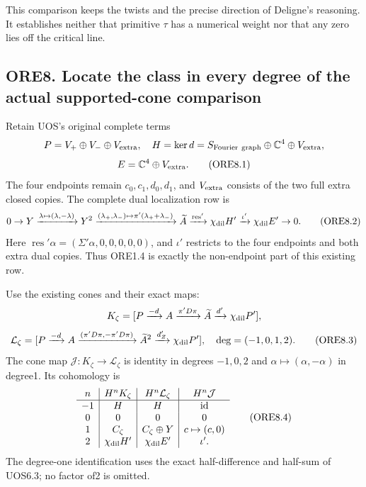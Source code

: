 This comparison keeps the twists and the precise direction of Deligne's
reasoning. It establishes neither that primitive \(\tau\) has a
numerical weight nor that any zero lies off the critical line.

\subsection{ORE8. Locate the class in every degree of the actual
supported-cone
comparison}\label{ore8.-locate-the-class-in-every-degree-of-the-actual-supported-cone-comparison}

Retain UOS's original complete terms \[
P=V_+\oplus V_-\oplus V_{\rm extra},\quad
H=\ker d=S_{\rm Fourier\ graph}\oplus\mathbb C^4\oplus V_{\rm extra},
\] \[
E=\mathbb C^4\oplus V_{\rm extra}.
\tag{ORE8.1}
\] The four endpoints remain \(c_0,c_1,d_0,d_1\), and \(V_{\rm extra}\)
consists of the two full extra closed copies. The complete dual
localization row is \[
0\to Y\xrightarrow{\lambda\mapsto(\lambda,-\lambda)}Y^2
\xrightarrow{(\lambda_+,\lambda_-)\mapsto
\pi'(\lambda_++\lambda_-)}\widetilde A
\xrightarrow{\operatorname{res}'}\chi_{\rm dil}H'
\xrightarrow{\iota'}\chi_{\rm dil}E'\to0.
\tag{ORE8.2}
\] Here \(\operatorname{res}'\alpha=(\Sigma'\alpha,0,0,0,0,0)\), and
\(\iota'\) restricts to the four endpoints and both extra dual copies.
Thus ORE1.4 is exactly the non-endpoint part of this existing row.

Use the existing cones and their exact maps: \[
K_\zeta=[P\xrightarrow{-d}A
\xrightarrow{\pi'D\pi}\widetilde A
\xrightarrow{d'}\chi_{\rm dil}P'],
\] \[
\mathcal L_\zeta=[P\xrightarrow{-d}A
\xrightarrow{(\pi'D\pi,-\pi'D\pi)}\widetilde A^2
\xrightarrow{d_Z'}\chi_{\rm dil}P'],
\quad\deg=(-1,0,1,2).
\tag{ORE8.3}
\] The cone map \(\mathcal J:K_\zeta\to\mathcal L_\zeta\) is identity in
degrees \(-1,0,2\) and \(\alpha\mapsto(\alpha,-\alpha)\) in degree1. Its
cohomology is \[
\begin{array}{c|c|c|c}
n&H^nK_\zeta&H^n\mathcal L_\zeta&H^n\mathcal J\\ \hline
-1&H&H&\mathrm{id}\\
0&0&0&0\\
1&C_\zeta&C_\zeta\oplus Y&c\mapsto(c,0)\\
2&\chi_{\rm dil}H'&\chi_{\rm dil}E'&\iota'.
\end{array}
\tag{ORE8.4}
\] The degree-one identification uses the exact half-difference and
half-sum of UOS6.3; no factor of2 is omitted.

